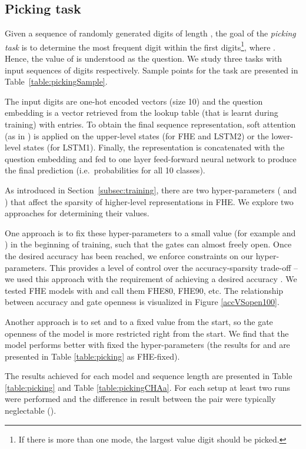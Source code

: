 \subsection{Picking task}

Given a sequence of randomly generated digits of length , the goal of the \emph{picking task} is to determine the most frequent digit within the first  digits\footnote{If there is more than one  mode, the largest value digit should be picked.}, where . Hence, the value of  is understood as the question. We study three tasks with input sequences of  digits respectively. Sample points for the task are presented in Table~\ref{table:pickingSample}.

The input digits  are one-hot encoded vectors (size 10) and the question embedding  is a vector retrieved from the lookup table (that is learnt during training) with  entries. To obtain the final sequence representation, soft attention (as in \citet{bahdanau2014}) is applied on the upper-level states  (for FHE and LSTM2) or the lower-level states  (for LSTM1). Finally, the representation is concatenated with the question embedding and fed to one layer feed-forward neural network to produce the final prediction (i.e.\, probabilities for all 10 classes).

As introduced in Section~\ref{subsec:training}, there are two hyper-parameters ( and ) that affect the sparsity of higher-level representations in FHE. We explore two approaches for determining their values.

One approach is to fix these hyper-parameters to a small value (for example   and ) in the beginning of training, such that the gates can almost freely open. Once the desired accuracy has been reached, we enforce constraints on our hyper-parameters. This provides a level of control over the accuracy-sparsity trade-off -- we used this approach  with the requirement of achieving a desired accuracy . We tested FHE models with \mbox{} and call them FHE80, FHE90, etc. The relationship between accuracy and gate openness is visualized in Figure \ref{accVSopen100}. 

Another approach is to set  and  to a fixed value from the start, so the gate openness of the model is more restricted right from the start. We find that the model performs better with fixed the hyper-parameters (the results for  and  are presented in Table \ref{table:picking} as FHE-fixed).

The results achieved for each model and sequence length are presented in Table \ref{table:picking} and Table \ref{table:pickingCHAa}. For each setup at least two runs were performed and the difference in result between the pair were typically neglectable ().

